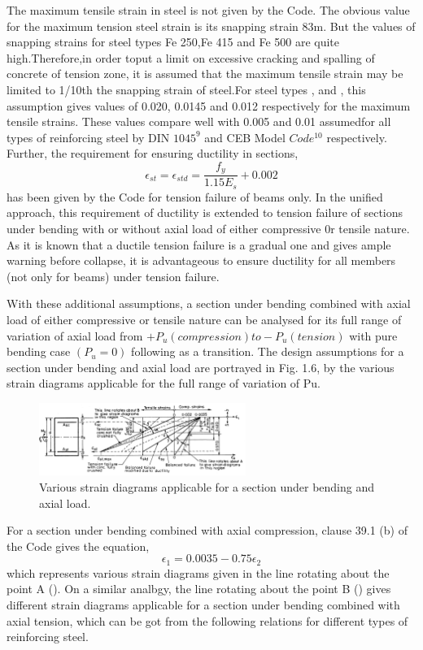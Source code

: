 The maximum tensile strain in steel is not given by the Code. The obvious
value for the maximum tension steel strain is its snapping strain 83m. But
the values of snapping strains for steel types Fe 250,Fe 415 and Fe 500 are
quite high.Therefore,in order toput a limit on excessive cracking and
spalling of concrete of tension zone, it is assumed that the maximum
tensile strain may be limited to 1/10th the snapping strain of steel.For 
steel types {\fetwofivezero}, {\fefouronefive} and {\fefivezerozero}, this 
assumption gives values of 0.020, 0.0145 and 0.012 respectively for
the maximum tensile strains.
These values compare well with 0.005 and 0.01 assumedfor all types of
reinforcing steel by DIN $1045^9$ and CEB Model $Code^{10}$ respectively.
Further, the requirement for ensuring ductility in sections,
$$\epsilon_{st}=\epsilon_{std}=\frac{f_y}{1.15 E_s}+0.002$$
has been given by the Code for tension failure of beams only. In the
uniﬁed approach, this requirement of ductility is extended to tension
failure of sections under bending with or without axial load of either
compressive 0r tensile nature. As it is known that a ductile tension
failure is a gradual one and gives ample warning before collapse, it
is advantageous to ensure ductility for all members (not only for beams) 
under tension failure.

With these additional assumptions, a section under bending combined with
axial load of either compressive or tensile nature can be analysed for
its full range of variation of axial load from
$+P_u(compression) to -P_u (tension)$ with pure bending case $(P_u=0)$
following as a transition. The design assumptions for a section under
bending and axial load are portrayed in Fig. 1.6, by the various strain
diagrams applicable for the full range of variation of Pu.

\begin{figure}
\centering
\includegraphics[width=0.6\textwidth]{images/various.png}
\caption{Various strain diagrams applicable for a section under bending and axial load.}
\label{fig:various}
\end{figure}

For a section under bending combined with axial compression, clause 39.1 (b) of the Code
gives the equation,
\begin{equation}
\epsilon_1=0.0035-0.75\epsilon_2
\end{equation}
which represents various strain diagrams given in the line rotating about
the point A (). On a similar analbgy, the line rotating about the
point B () gives different strain diagrams applicable for a
section under bending combined with axial tension, which can be got from
the following relations for different types of reinforcing steel.

